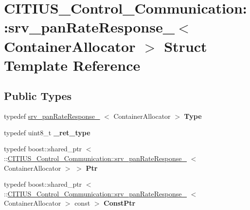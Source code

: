 \hypertarget{struct_c_i_t_i_u_s___control___communication_1_1srv__pan_rate_response__}{\section{\-C\-I\-T\-I\-U\-S\-\_\-\-Control\-\_\-\-Communication\-:\-:srv\-\_\-pan\-Rate\-Response\-\_\-$<$ \-Container\-Allocator $>$ \-Struct \-Template \-Reference}
\label{struct_c_i_t_i_u_s___control___communication_1_1srv__pan_rate_response__}
}
\subsection*{\-Public \-Types}
\begin{DoxyCompactItemize}
\item 
\hypertarget{struct_c_i_t_i_u_s___control___communication_1_1srv__pan_rate_response___aeadcfff626fea389d2b14074b085dc9a}{typedef \hyperlink{struct_c_i_t_i_u_s___control___communication_1_1srv__pan_rate_response__}{srv\-\_\-pan\-Rate\-Response\-\_\-}\*
$<$ \-Container\-Allocator $>$ {\bfseries \-Type}}\label{struct_c_i_t_i_u_s___control___communication_1_1srv__pan_rate_response___aeadcfff626fea389d2b14074b085dc9a}

\item 
\hypertarget{struct_c_i_t_i_u_s___control___communication_1_1srv__pan_rate_response___aad344db016cc088dde269a6c2564c5d7}{typedef uint8\-\_\-t {\bfseries \-\_\-ret\-\_\-type}}\label{struct_c_i_t_i_u_s___control___communication_1_1srv__pan_rate_response___aad344db016cc088dde269a6c2564c5d7}

\item 
\hypertarget{struct_c_i_t_i_u_s___control___communication_1_1srv__pan_rate_response___aaf32a8603fc8fd27ec1ba3f2357b8107}{typedef boost\-::shared\-\_\-ptr\*
$<$ \-::\hyperlink{struct_c_i_t_i_u_s___control___communication_1_1srv__pan_rate_response__}{\-C\-I\-T\-I\-U\-S\-\_\-\-Control\-\_\-\-Communication\-::srv\-\_\-pan\-Rate\-Response\-\_\-}\*
$<$ \-Container\-Allocator $>$ $>$ {\bfseries \-Ptr}}\label{struct_c_i_t_i_u_s___control___communication_1_1srv__pan_rate_response___aaf32a8603fc8fd27ec1ba3f2357b8107}

\item 
\hypertarget{struct_c_i_t_i_u_s___control___communication_1_1srv__pan_rate_response___aeb291c4ff3fde6e4b5ff94527189f6da}{typedef boost\-::shared\-\_\-ptr\*
$<$ \-::\hyperlink{struct_c_i_t_i_u_s___control___communication_1_1srv__pan_rate_response__}{\-C\-I\-T\-I\-U\-S\-\_\-\-Control\-\_\-\-Communication\-::srv\-\_\-pan\-Rate\-Response\-\_\-}\*
$<$ \-Container\-Allocator $>$ const  $>$ {\bfseries \-Const\-Ptr}}\label{struct_c_i_t_i_u_s___control___communication_1_1srv__pan_rate_response___aeb291c4ff3fde6e4b5ff94527189f6da}

\end{DoxyCompactItemize}
